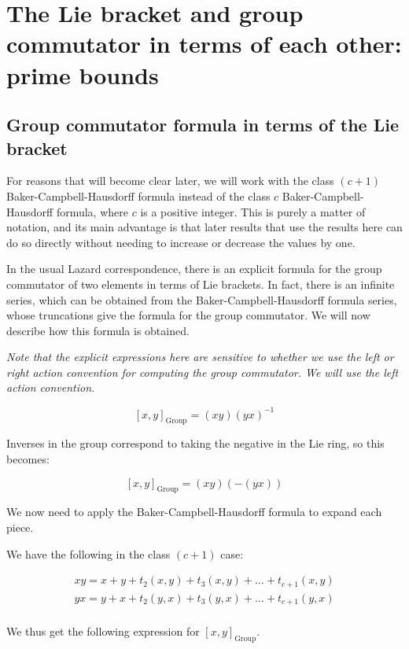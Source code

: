 \section{The Lie bracket and group commutator in terms of each other: prime bounds}\label{sec:group-commutator-and-lie-bracket-ito-each-other}

\subsection{Group commutator formula in terms of the Lie bracket}\label{sec:group-commutator-ito-lie-bracket}

For reasons that will become clear later, we will work with the class
$(c + 1)$ Baker-Campbell-Hausdorff formula instead of the class $c$
Baker-Campbell-Hausdorff formula, where $c$ is a positive
integer. This is purely a matter of notation, and its main advantage
is that later results that use the results here can do so directly
without needing to increase or decrease the values by one.

In the usual Lazard correspondence, there is an explicit formula for
the group commutator of two elements in terms of Lie brackets. In
fact, there is an infinite series, which can be obtained from the
Baker-Campbell-Hausdorff formula series, whose truncations give the
formula for the group commutator. We will now describe how this
formula is obtained.

{\em Note that the explicit expressions here are sensitive to whether
  we use the left or right action convention for computing the group
  commutator. We will use the left action convention.}

$$[x,y]_{\text{Group}} = (xy)(yx)^{-1}$$

Inverses in the group correspond to taking the negative in the Lie
ring, so this becomes:

$$[x,y]_{\text{Group}} = (xy)(-(yx))$$

We now need to apply the Baker-Campbell-Hausdorff formula to expand
each piece.

We have the following in the class $(c + 1)$ case:

\begin{eqnarray*}
  xy = x + y + t_2(x,y) + t_3(x,y) + \dots + t_{c+1}(x,y)\\
  yx = y + x + t_2(y,x) + t_3(y,x) + \dots + t_{c+1}(y,x)\\
\end{eqnarray*}

We thus get the following expression for $[x,y]_{\text{Group}}$.

